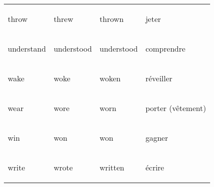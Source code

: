 \documentclass[
]{article}
\begin{document}
\begin{longtable}{>{\bfseries\raggedright\arraybackslash}p{3cm}ll>{\bfseries\raggedright\arraybackslash}p{3cm}}
throw & threw & thrown & jeter\\

\rowcolor{gray!6}  understand & understood & understood & comprendre\\

wake & woke & woken & réveiller\\

\rowcolor{gray!6}  wear & wore & worn & porter (vêtement)\\

win & won & won & gagner\\

\rowcolor{gray!6}  write & wrote & written & écrire\\
\bottomrule
\end{longtable}
\end{document}
